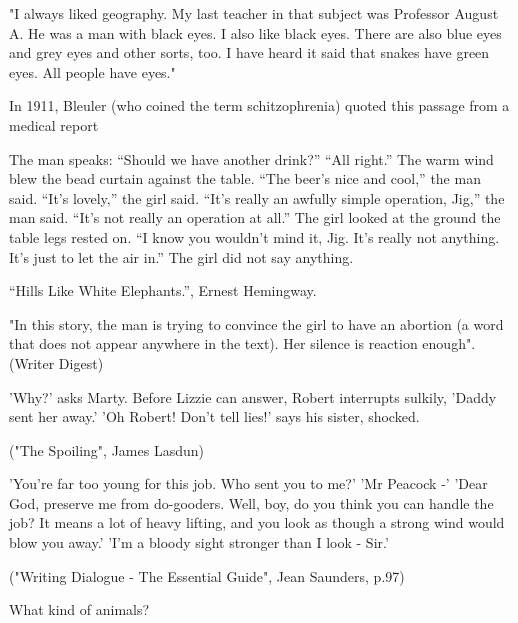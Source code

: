 \documentclass[11pt]{article}
\newenvironment{narrow}[2]{%
 \begin{list}{}{%
  \setlength{\topsep}{0pt}%
  \setlength{\leftmargin}{#1}%
  \setlength{\rightmargin}{#2}%
  \setlength{\listparindent}{\parindent}%
  \setlength{\itemindent}{\parindent}%
  \setlength{\parsep}{\parskip}%
 }%
\item[]}{\end{list}}
\begin{document}
\begin{itemize}
\item 
\begin{narrow}{1.0cm}{1.0cm}
"I always liked geography. My last teacher in that subject was Professor 
August A. He was a man with black eyes. I also like black eyes. There are also 
blue eyes and grey eyes and other sorts, too. I have heard it said that snakes 
have green eyes. All people have eyes."
\end{narrow}

In 1911, Bleuler (who coined the term schitzophrenia) quoted this passage from a medical report

\item 
\begin{narrow}{1.0cm}{1.0cm}
The man speaks:
“Should we have another drink?”
“All right.”
The warm wind blew the bead curtain against the table.
“The beer’s nice and cool,” the man said.
“It’s lovely,” the girl said.
“It’s really an awfully simple operation, Jig,” the man said. “It’s not really an operation at all.”
The girl looked at the ground the table legs rested on.
“I know you wouldn’t mind it, Jig. It’s really not anything. It’s just to let the air in.”
The girl did not say anything.
\end{narrow}
“Hills Like White Elephants.”, Ernest Hemingway.

 "In this story, the man is trying to convince the girl to have an abortion (a word that does not appear anywhere in the text). Her silence is reaction enough". (Writer Digest)
\item 
\begin{narrow}{1.0cm}{1.0cm}
'Why?' asks Marty.
Before Lizzie can answer, Robert interrupts sulkily, 'Daddy sent her away.'
'Oh Robert! Don't tell lies!' says his sister, shocked.
\end{narrow}
("The Spoiling", James Lasdun)


\item 
\begin{narrow}{1.0cm}{1.0cm}
'You're far too young for this job. Who sent you to me?'
'Mr Peacock -'
'Dear God, preserve me from do-gooders. Well, boy, do you think you can handle the job? It means a lot of heavy lifting, and you look as though a strong wind would blow you away.'
'I'm a bloody sight stronger than I look - Sir.'
\end{narrow}
("Writing Dialogue - The Essential Guide", Jean Saunders, p.97)


\item 
\begin{narrow}{1.0cm}{1.0cm}
What kind of animals?


\end{narrow}
\end{itemize}
\end{document}
